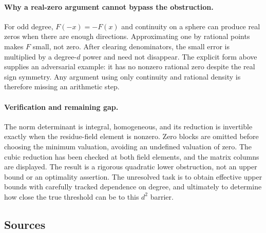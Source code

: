 \documentclass[11pt,a4paper]{article}
\begin{document}
\paragraph{Why a real-zero argument cannot bypass the obstruction.}
For odd degree, $F(-x)=-F(x)$ and continuity on a sphere can produce real zeros when there are enough directions. Approximating one by rational points makes $F$ small, not zero. After clearing denominators, the small error is multiplied by a degree-$d$ power and need not disappear. The explicit form above supplies an adversarial example: it has no nonzero rational zero despite the real sign symmetry. Any argument using only continuity and rational density is therefore missing an arithmetic step.

\paragraph{Verification and remaining gap.}
The norm determinant is integral, homogeneous, and its reduction is invertible exactly when the residue-field element is nonzero. Zero blocks are omitted before choosing the minimum valuation, avoiding an undefined valuation of zero. The cubic reduction has been checked at both field elements, and the matrix columns are displayed. The result is a rigorous quadratic lower obstruction, not an upper bound or an optimality assertion. The unresolved task is to obtain effective upper bounds with carefully tracked dependence on degree, and ultimately to determine how close the true threshold can be to this $d^2$ barrier.

\subsection{Sources}
\end{document}
